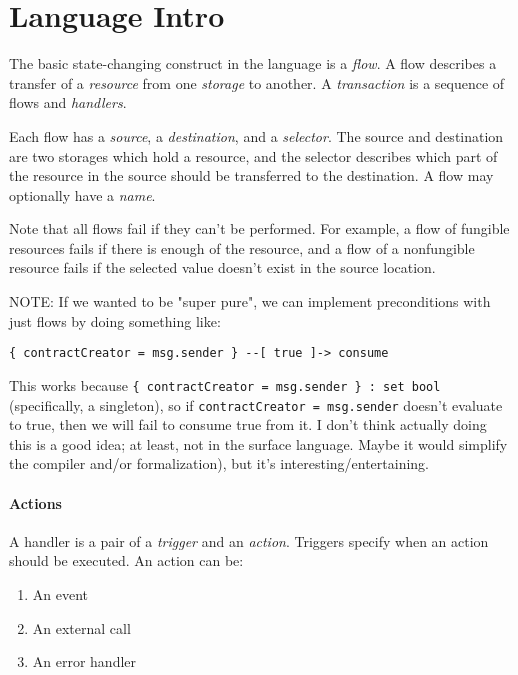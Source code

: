 \documentclass[10pt]{article}
\begin{document}
\section{Language Intro}

The basic state-changing construct in the language is a \emph{flow}.
A flow describes a transfer of a \emph{resource} from one \emph{storage} to another.
A \emph{transaction} is a sequence of flows and \emph{handlers}.

Each flow has a \emph{source}, a \emph{destination}, and a \emph{selector}.
The source and destination are two storages which hold a resource, and the selector describes which part of the resource in the source should be transferred to the destination.
A flow may optionally have a \emph{name}.

Note that all flows fail if they can't be performed.
For example, a flow of fungible resources fails if there is enough of the resource, and a flow of a nonfungible resource fails if the selected value doesn't exist in the source location.

NOTE: If we wanted to be "super pure", we can implement preconditions with just flows by doing something like:
\begin{lstlisting}
{ contractCreator = msg.sender } --[ true ]-> consume
\end{lstlisting}
This works because \lstinline|{ contractCreator = msg.sender } : set bool| (specifically, a singleton), so if \lstinline{contractCreator = msg.sender} doesn't evaluate to true, then we will fail to consume true from it.
I don't think actually doing this is a good idea; at least, not in the surface language.
Maybe it would simplify the compiler and/or formalization), but it's interesting/entertaining.

\paragraph{Actions}
A handler is a pair of a \emph{trigger} and an \emph{action}.
Triggers specify when an action should be executed.
An action can be:
\begin{enumerate}
    \item An event
    \item An external call
    \item An error handler
\end{enumerate}

\end{document}
